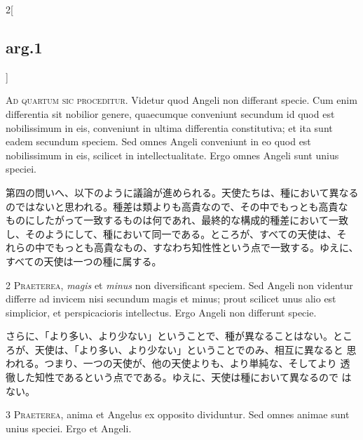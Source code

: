 \documentclass[paper=a4paper,fontsize=10pt,jafontsize=9pt,titlepage]{jlreq}
\begin{document}
\begin{paracol}{2}[\subsection{arg.1}]

{\huge A}{\scshape d quartum sic proceditur}. Videtur quod
Angeli non differant specie. Cum enim differentia sit nobilior genere,
quaecumque conveniunt secundum id quod est nobilissimum in eis,
conveniunt in ultima differentia constitutiva; et ita sunt eadem
secundum speciem. Sed omnes Angeli conveniunt in eo quod est
nobilissimum in eis, scilicet in intellectualitate. Ergo omnes Angeli
sunt unius speciei.

\switchcolumn

第四の問いへ、以下のように議論が進められる。天使たちは、種において異なる
 のではないと思われる。種差は類よりも高貴なので、その中でもっとも高貴な
 ものにしたがって一致するものは何であれ、最終的な構成的種差において一致
 し、そのようにして、種において同一である。ところが、すべての天使は、そ
 れらの中でもっとも高貴なもの、すなわち知性性という点で一致する。ゆえに、
 すべての天使は一つの種に属する。


{\scshape 2 Praeterea}, {\itshape magis} et {\itshape minus} non diversificant
speciem. Sed Angeli non videntur differre ad invicem nisi secundum magis
et minus; prout scilicet unus alio est simplicior, et perspicacioris
intellectus. Ergo Angeli non differunt specie.

\switchcolumn

さらに、「より多い、より少ない」ということで、種が異なることはない。とこ
 ろが、天使は、「より多い、より少ない」ということでのみ、相互に異なると
 思われる。つまり、一つの天使が、他の天使よりも、より単純な、そしてより
 透徹した知性であるという点でである。ゆえに、天使は種において異なるので
 はない。


{\scshape 3 Praeterea}, anima et Angelus ex opposito
dividuntur. Sed omnes animae sunt unius speciei. Ergo et Angeli.

\switchcolumn


\end{paracol}
\end{document}
